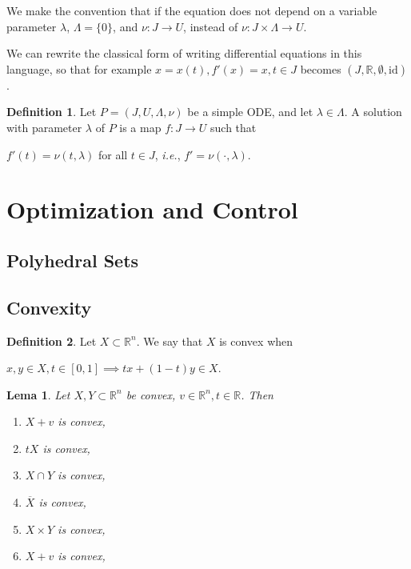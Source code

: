 \documentclass[]{article}
\newtheorem{lemma}{Lema}[section]
\theoremstyle{definition}
\newtheorem{definition}{Definition}[section]
\theoremstyle{definition}
\newcommand{\raw}{\rightarrow}
\newcommand{\ie}{\textit{i.e.}}
\newcommand{\bb}{\mathbb}
\begin{document}
	We make the convention that if the equation does not depend on a variable parameter $\lambda$, $\Lambda = \{0\}$, and $\nu: J \raw U$, instead of $\nu:J \times \Lambda \raw U$.

	We can rewrite the classical form of writing differential equations in this language, so that for example $x = x(t), f'(x) = x, t \in J$ becomes $(J, \bb{R}, \emptyset, \text{id} )$.  
	
	\begin{definition}
		Let $P = (J, U, \Lambda, \nu)$ be a simple ODE, and let $\lambda \in \Lambda$. A solution with parameter $\lambda$ of $P$ is a map $f: J \raw U$ such that 
		
		\begin{center}
			$f'(t) = \nu(t, \lambda)$ for all $t \in J$, \ie, $f' = \nu(\cdot, \lambda)$.
		\end{center}
	\end{definition}

	
	
	\section{Optimization and Control}
		\subsection{Polyhedral Sets}
		\subsection{Convexity}
		
		\begin{definition}
			Let $X \subset \bb{R}^n$. We say that $X$ is convex when
			
			\begin{center}
				$x, y \in X, t \in [0, 1] \implies tx + (1-t)y \in X$.
			\end{center}
			
		\end{definition}
		
		\begin{lemma}
			Let $X, Y \subset \bb{R}^n$ be convex, $v \in \bb{R}^n, t \in \bb{R}$. Then
			
			\begin{enumerate}
				\item $X + v$ is convex,
				
				\item $tX$ is convex,

				\item $X \cap Y$ is convex,

				\item $\overline{X}$ is convex,

				\item $X \times Y$ is convex,

				\item $X + v$ is convex,

			\end{enumerate} 
		\end{lemma}
		
\end{document}
